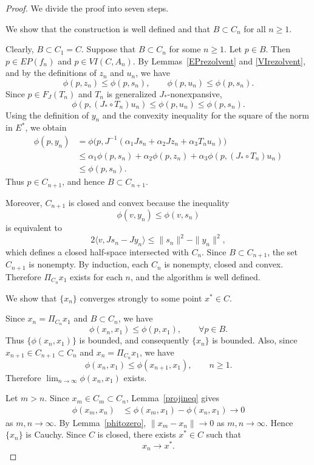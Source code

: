 \documentclass[10pt,a4paper]{amsart}
\begin{document}
\begin{proof}
We divide the proof into seven steps.

 We show that the construction is well defined and that $B\subset C_n$ for all $n\geq 1$.

Clearly, $B\subset C_1=C$. Suppose that $B\subset C_n$ for some $n\geq 1$. Let $p\in B$. Then $p\in EP(f_n)$ and $p\in VI(C,A_n)$. By Lemmas~\ref{EPrezolvent} and \ref{VIrezolvent}, and by the definitions of $z_n$ and $u_n$, we have
\begin{equation}\label{resolventineq}
\phi(p,z_n)\leq \phi(p,s_n),\qquad \phi(p,u_n)\leq \phi(p,s_n).
\end{equation}
Since $p\in F_J(T_n)$ and $T_n$ is generalized $J_{*}$-nonexpansive,
\begin{equation}\label{Tineq}
\phi(p,(J_{*}\circ T_n)u_n)\leq \phi(p,u_n)\leq \phi(p,s_n).
\end{equation}
Using the definition of $y_n$ and the convexity inequality for the square of the norm in $E^{*}$, we obtain
\begin{align*}
\phi(p,y_n)
&=\phi\big(p,J^{-1}(\alpha_1Js_n+\alpha_2Jz_n+\alpha_3T_nu_n)\big)\\
&\leq \alpha_1\phi(p,s_n)+\alpha_2\phi(p,z_n)+\alpha_3\phi(p,(J_{*}\circ T_n)u_n)\\
&\leq \phi(p,s_n).
\end{align*}
Thus $p\in C_{n+1}$, and hence $B\subset C_{n+1}$.

Moreover, $C_{n+1}$ is closed and convex because the inequality
\[
\phi(v,y_n)\leq \phi(v,s_n)
\]
is equivalent to
\[
2\langle v,Js_n-Jy_n\rangle\leq \|s_n\|^2-\|y_n\|^2,
\]
which defines a closed half-space intersected with $C_n$. Since $B\subset C_{n+1}$, the set $C_{n+1}$ is nonempty. By induction, each $C_n$ is nonempty, closed and convex. Therefore $\Pi_{C_n}x_1$ exists for each $n$, and the algorithm is well defined.

 We show that $\{x_n\}$ converges strongly to some point $x^{*}\in C$.

Since $x_n=\Pi_{C_n}x_1$ and $B\subset C_n$, we have
\[
\phi(x_n,x_1)\leq \phi(p,x_1),\qquad \forall p\in B.
\]
Thus $\{\phi(x_n,x_1)\}$ is bounded, and consequently $\{x_n\}$ is bounded. Also, since $x_{n+1}\in C_{n+1}\subset C_n$ and $x_n=\Pi_{C_n}x_1$, we have
\[
\phi(x_n,x_1)\leq \phi(x_{n+1},x_1),\qquad n\geq 1.
\]
Therefore $\lim_{n\to\infty}\phi(x_n,x_1)$ exists.

Let $m>n$. Since $x_m\in C_m\subset C_n$, Lemma~\ref{projineq} gives
\begin{align}\label{Cauchyineq}
\phi(x_m,x_n)&\leq \phi(x_m,x_1)-\phi(x_n,x_1)\to 0
\end{align}
as $m,n\to\infty$. By Lemma~\ref{phitozero}, $\|x_m-x_n\|\to 0$ as $m,n\to\infty$. Hence $\{x_n\}$ is Cauchy. Since $C$ is closed, there exists $x^{*}\in C$ such that
\begin{equation}\label{xnconv}
x_n\to x^{*}.
\end{equation}


\end{proof}
\end{document}
